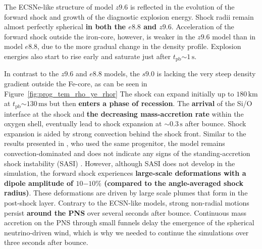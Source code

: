 \documentclass[fleqn,usenatbib]{mnras}
\newcommand{\tpb}{\ensuremath{t_{\text{pb}}}}
\newcommand{\km}{\ensuremath{\mathrm{km}}}
\newcommand{\s}{\ensuremath{\text{s}}}
\newcommand{\ms}{\ensuremath{\text{ms}}}
\begin{document}
The ECSNe-like structure of model $z9.6$ is reflected in the evolution of the forward shock and growth of the diagnostic explosion energy. Shock radii remain almost perfectly spherical \textbf{in both the $e8.8$ and $z9.6$}. Acceleration of the forward shock outside the iron-core, however, is weaker in the $z9.6$ model than in model $e8.8$, due to the more gradual change in the density profile. Explosion energies also start to rise early and saturate just after $\tpb\mathord{\sim}1\,\s$.

In contrast to the $z9.6$ and $e8.8$ models, the $s9.0$ is lacking the very steep density gradient outside the Fe-core, as can be seen in Figure~\ref{fig:prog_tem_rho_ye_rhor}
The shock can expand initially up to $180\,\km$ at $\tpb\mathord{\sim}130\,\ms$ but then \textbf{enters a phase of recession}. The \textbf{arrival} of the Si/O interface at the shock and \textbf{the decreasing mass-accretion rate} within the oxygen shell, eventually lead to shock expansion at $\mathord{\sim}0.3\,\s$ after bounce. Shock expansion is aided by strong convection behind the shock front. Similar to the results presented in \cite{Glas2019}, who used the same progenitor, the model remains convection-dominated and does not indicate any signs of the standing-accretion shock instability (SASI) \citep{Blondin2003,Foglizzo2007}.
However, although SASI does not develop in the simulation, the forward shock experiences \textbf{large-scale deformations with a dipole amplitude of $10\mathord{-}10\%$ (compared to the angle-averaged shock radius)}. These deformations are driven by large scale plumes that form in the post-shock layer. 
Contrary to the ECSN-like models, strong non-radial motions persist \textbf{around the PNS} over several seconds after bounce. Continuous mass accretion on the PNS through small funnels delay the emergence of the spherical neutrino-driven wind, which is why we needed to continue the simulations over three seconds after bounce.
\end{document}
